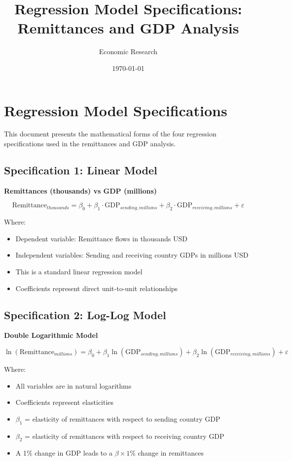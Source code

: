 \documentclass{article}
\title{Regression Model Specifications: Remittances and GDP Analysis}
\author{Economic Research}
\date{\today}
\begin{document}
\maketitle

\section{Regression Model Specifications}

This document presents the mathematical forms of the four regression specifications used in the remittances and GDP analysis.

\subsection{Specification 1: Linear Model}
\textbf{Remittances (thousands) vs GDP (millions)}

\begin{equation}
\text{Remittance}_{thousands} = \beta_0 + \beta_1 \cdot \text{GDP}_{sending,millions} + \beta_2 \cdot \text{GDP}_{receiving,millions} + \varepsilon
\end{equation}

Where:
\begin{itemize}
    \item Dependent variable: Remittance flows in thousands USD
    \item Independent variables: Sending and receiving country GDPs in millions USD
    \item This is a standard linear regression model
    \item Coefficients represent direct unit-to-unit relationships
\end{itemize}

\subsection{Specification 2: Log-Log Model}
\textbf{Double Logarithmic Model}

\begin{equation}
\ln(\text{Remittance}_{millions}) = \beta_0 + \beta_1 \ln(\text{GDP}_{sending,millions}) + \beta_2 \ln(\text{GDP}_{receiving,millions}) + \varepsilon
\end{equation}

Where:
\begin{itemize}
    \item All variables are in natural logarithms
    \item Coefficients represent elasticities
    \item $\beta_1$ = elasticity of remittances with respect to sending country GDP
    \item $\beta_2$ = elasticity of remittances with respect to receiving country GDP
    \item A 1\% change in GDP leads to a $\beta \times 1$\% change in remittances
\end{itemize}
\end{document}
